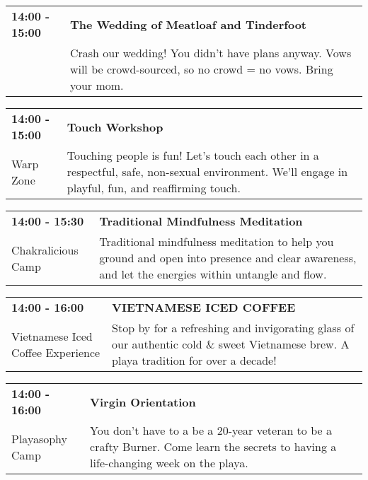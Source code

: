 \begin{tabular}{ p{1in} p{2.2in} }
    \textbf{14:00 - 15:00} & \textbf{The Wedding of Meatloaf and Tinderfoot } \\
    ~ \newline  & Crash our wedding! You didn't have plans anyway. Vows will be crowd-sourced, so no crowd = no vows. Bring your mom. \\
    \hline 
\end{tabular}
    
\begin{tabular}{ p{1in} p{2.2in} }
    \textbf{14:00 - 15:00} & \textbf{Touch Workshop} \\
    Warp Zone \newline  & Touching people is fun! Let's touch each other in a respectful, safe, non-sexual environment. We'll engage in playful, fun, and reaffirming touch. \\
    \hline 
\end{tabular}
    
\begin{tabular}{ p{1in} p{2.2in} }
    \textbf{14:00 - 15:30} & \textbf{Traditional Mindfulness Meditation} \\
    Chakralicious Camp \newline  & Traditional mindfulness meditation to help you ground and open into presence and clear awareness, and let the energies within untangle and flow. \\
    \hline 
\end{tabular}
    
\begin{tabular}{ p{1in} p{2.2in} }
    \textbf{14:00 - 16:00} & \textbf{VIETNAMESE ICED COFFEE} \\
    Vietnamese Iced Coffee Experience \newline  & Stop by for a refreshing and invigorating glass of our authentic cold \& sweet Vietnamese brew. A playa tradition for over a decade! \\
    \hline 
\end{tabular}
    
\begin{tabular}{ p{1in} p{2.2in} }
    \textbf{14:00 - 16:00} & \textbf{Virgin Orientation} \\
    Playasophy Camp \newline  & You don't have to a be a 20-year veteran to be a crafty Burner. Come learn the secrets to having a life-changing week on the playa. \\
    \hline 
\end{tabular}
    
